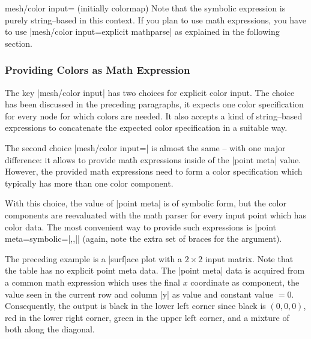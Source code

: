 {{\begin{pgfplotskey}{mesh/color input= (initially colormap)}
Note that the symbolic expression is purely string--based in this context. If you plan to use math expressions, you have to use |mesh/color input=explicit mathparse| as explained in the following section.

\subsubsection{Providing Colors as Math Expression}
\label{sec:surf:explicit:color:math}

The key |mesh/color input| has two choices for explicit color input. The choice  has been discussed in the preceding paragraphs, it expects one color specification for every node for which colors are needed. It also accepts a kind of string--based expressions to concatenate the expected color specification in a suitable way.

The second choice |mesh/color input=| is almost the same -- with one major difference: it allows to provide math expressions inside of the |point meta| value. However, the provided math expressions need to form a color specification which typically has more than one color component. 

With this choice, the value of |point meta| is of symbolic form, but the color components are reevaluated with the math parser for every input point which has color data. The most convenient way to provide such expressions is |point meta={symbolic={|,,|}}| (again, note the extra set of braces for the argument). 

\begin{codeexample}[]
\end{codeexample}
\noindent The preceding example is a |surf|ace plot with a $2 \times 2$ input matrix. Note that the table has no explicit point meta data. The |point meta| data is acquired from a common math expression which uses the final $x$ coordinate as  component, the value seen in the current row and column |y| as  value and constant value $=0$. Consequently, the output is black in the lower left corner since black is $(0,0,0)$, red in the lower right corner, green in the upper left corner, and a mixture of both along the diagonal.


\end{pgfplotskey}}}
